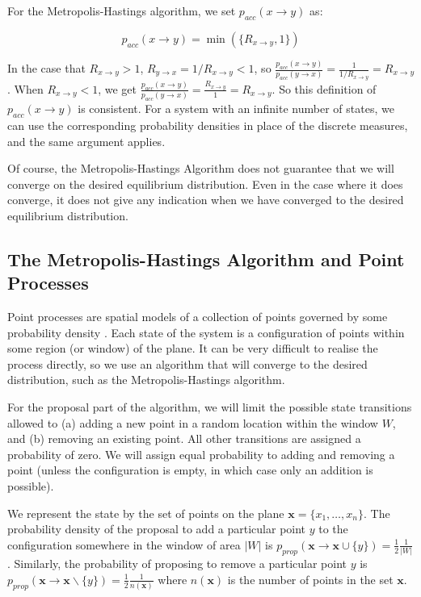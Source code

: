 For the Metropolis-Hastings algorithm, we set $p_{acc}(x \to y)$ as:

\begin{equation}
p_{acc}(x \to y) = \min(\{R_{x \to y}, 1\})
\end{equation}


\noindent In the case that $R_{x \to y} > 1$, $R_{y \to x} = 1 / R_{x
\to y} < 1$, so $\frac{p_{acc}(x \to y)}{p_{acc}(y \to x)} =
\frac{1}{1 / R_{x \to y}} = R_{x \to y}$.  When $R_{x \to y} < 1$, we
get $\frac{p_{acc}(x \to y)}{p_{acc}(y \to x)} = \frac{R_{x \to y}}{1}
= R_{x \to y}$.  So this definition of $p_{acc}(x \to y)$ is
consistent.  For a system with an infinite number of states, we can
use the corresponding probability densities in place of the discrete
measures, and the same argument applies.

Of course, the Metropolis-Hastings Algorithm does not guarantee that
we will converge on the desired equilibrium distribution.  Even in the
case where it does converge, it does not give any indication when we
have converged to the desired equilibrium distribution.


\subsection{The Metropolis-Hastings Algorithm and Point Processes}
\label{sect:mh-points}

Point processes are spatial models of a collection of points governed
by some probability density \cite{markov-point-processes-2}.  Each
state of the system is a configuration of points within some region
(or window) of the plane.  It can be very difficult to realise the
process directly, so we use an algorithm that will converge to the
desired distribution, such as the Metropolis-Hastings algorithm.

For the proposal part of the algorithm, we will limit the possible
state transitions allowed to (a) adding a new point in a random
location within the window $W$, and (b) removing an existing point.
All other transitions are assigned a probability of zero.  We will
assign equal probability to adding and removing a point (unless the
configuration is empty, in which case only an addition is possible).

We represent the state by the set of points on the plane
$\mathbf{x} = \{ x_1, \ldots, x_n \}$.  The probability density of the
proposal to add a particular point $y$ to the configuration somewhere
in the window of area $|W|$ is $p_{prop}(\mathbf{x} \to \mathbf{x}\cup
\{y\}) = \frac{1}{2} \frac{1}{|W|}$.  Similarly, the probability of
proposing to remove a particular point $y$ is $p_{prop}(\mathbf{x} \to
\mathbf{x}\backslash \{y\}) = \frac{1}{2} \frac{1}{n(\mathbf{x})}$
where $n(\mathbf{x})$ is the number of points in the set $\mathbf{x}$.

